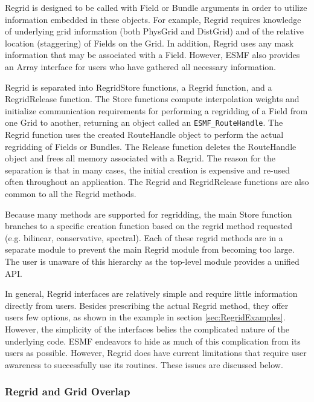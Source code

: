 

Regrid is designed to be called with Field or Bundle
arguments in order to utilize information embedded in
these objects.  For example, Regrid requires knowledge
of underlying grid information (both PhysGrid and DistGrid)
and of the relative location (staggering) of Fields on
the Grid.  In addition, Regrid uses any mask information
that may be associated with a Field.  However, ESMF also
provides an Array interface for users who have gathered all
necessary information.

Regrid is separated into RegridStore functions, a Regrid
function, and a RegridRelease function. The Store functions
compute interpolation weights and initialize communication
requirements for performing a regridding of a Field
from one Grid to another, returning an object called an
{\tt ESMF\_RouteHandle}.  The Regrid function uses
the created RouteHandle object to perform the actual regridding
of Fields or Bundles.  The Release function deletes the
RouteHandle object and frees all memory associated with a Regrid.
The reason for the separation is that in many cases, the
initial creation is expensive and re-used often throughout
an application.  The Regrid and RegridRelease functions are
also common to all the Regrid methods.

Because many methods are supported for regridding,
the main Store function branches to a specific
creation function based on the regrid method requested
(e.g. bilinear, conservative, spectral).  Each of
these regrid methods are in a separate module to
prevent the main Regrid module from becoming too
large.  The user is unaware of this hierarchy as the
top-level module provides a unified API.

In general, Regrid interfaces are relatively simple and require little
information directly from users.  Besides prescribing the actual Regrid method,
they offer users few options, as shown in the example in section
\ref{sec:RegridExamples}.  However, the simplicity of the interfaces belies the
complicated nature of the underlying code.  ESMF endeavors to hide as much
of this complication from its users as possible.  However, Regrid does have
current limitations that require user awareness to successfully use its
routines.  These issues are discussed below.

\subsubsection{Regrid and Grid Overlap}

